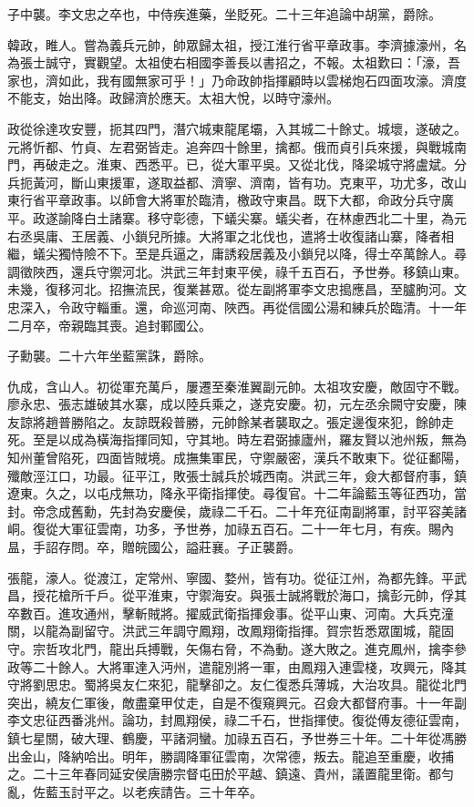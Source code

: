 \begin{pinyinscope}
子中襲。李文忠之卒也，中侍疾進藥，坐貶死。二十三年追論中胡黨，爵除。

韓政，睢人。嘗為義兵元帥，帥眾歸太祖，授江淮行省平章政事。李濟據濠州，名為張士誠守，實觀望。太祖使右相國李善長以書招之，不報。太祖歎曰：「濠，吾家也，濟如此，我有國無家可乎！」乃命政帥指揮顧時以雲梯炮石四面攻濠。濟度不能支，始出降。政歸濟於應天。太祖大悅，以時守濠州。

政從徐達攻安豐，扼其四門，潛穴城東龍尾壩，入其城二十餘丈。城壞，遂破之。元將忻都、竹貞、左君弼皆走。追奔四十餘里，擒都。俄而貞引兵來援，與戰城南門，再破走之。淮東、西悉平。已，從大軍平吳。又從北伐，降梁城守將盧斌。分兵扼黃河，斷山東援軍，遂取益都、濟寧、濟南，皆有功。克東平，功尤多，改山東行省平章政事。以師會大將軍於臨清，檄政守東昌。既下大都，命政分兵守廣平。政遂諭降白土諸寨。移守彰德，下蟻尖寨。蟻尖者，在林慮西北二十里，為元右丞吳庸、王居義、小鎖兒所據。大將軍之北伐也，遣將士收復諸山寨，降者相繼，蟻尖獨恃險不下。至是兵逼之，庸誘殺居義及小鎖兒以降，得士卒萬餘人。尋調徵陜西，還兵守禦河北。洪武三年封東平侯，祿千五百石，予世券。移鎮山東。未幾，復移河北。招撫流民，復業甚眾。從左副將軍李文忠搗應昌，至臚朐河。文忠深入，令政守輜重。還，命巡河南、陜西。再從信國公湯和練兵於臨清。十一年二月卒，帝親臨其喪。追封鄆國公。

子勳襲。二十六年坐藍黨誅，爵除。

仇成，含山人。初從軍充萬戶，屢遷至秦淮翼副元帥。太祖攻安慶，敵固守不戰。廖永忠、張志雄破其水寨，成以陸兵乘之，遂克安慶。初，元左丞余闕守安慶，陳友諒將趙普勝陷之。友諒既殺普勝，元帥餘某者襲取之。張定邊復來犯，餘帥走死。至是以成為橫海指揮同知，守其地。時左君弼據廬州，羅友賢以池州叛，無為知州董曾陷死，四面皆賊境。成撫集軍民，守禦嚴密，漢兵不敢東下。從征鄱陽，殲敵涇江口，功最。征平江，敗張士誠兵於城西南。洪武三年，僉大都督府事，鎮遼東。久之，以屯戍無功，降永平衛指揮使。尋復官。十二年論藍玉等征西功，當封。帝念成舊勳，先封為安慶侯，歲祿二千石。二十年充征南副將軍，討平容美諸峒。復從大軍征雲南，功多，予世券，加祿五百石。二十一年七月，有疾。賜內昷，手詔存問。卒，贈皖國公，謚莊襄。子正襲爵。

張龍，濠人。從渡江，定常州、寧國、婺州，皆有功。從征江州，為都先鋒。平武昌，授花槍所千戶。從平淮東，守禦海安。與張士誠將戰於海口，擒彭元帥，俘其卒數百。進攻通州，擊斬賊將。擢威武衛指揮僉事。從平山東、河南。大兵克潼關，以龍為副留守。洪武三年調守鳳翔，改鳳翔衛指揮。賀宗哲悉眾圍城，龍固守。宗哲攻北門，龍出兵搏戰，矢傷右脅，不為動。遂大敗之。進克鳳州，擒李參政等二十餘人。大將軍達入沔州，遣龍別將一軍，由鳳翔入連雲棧，攻興元，降其守將劉思忠。蜀將吳友仁來犯，龍擊卻之。友仁復悉兵薄城，大治攻具。龍從北門突出，繞友仁軍後，敵盡棄甲仗走，自是不復窺興元。召僉大都督府事。十一年副李文忠征西番洮州。論功，封鳳翔侯，祿二千石，世指揮使。復從傅友德征雲南，鎮七星關，破大理、鶴慶，平諸洞蠻。加祿五百石，予世券三十年。二十年從馮勝出金山，降納哈出。明年，勝調降軍征雲南，次常德，叛去。龍追至重慶，收捕之。二十三年春同延安侯唐勝宗督屯田於平越、鎮遠、貴州，議置龍里衛。都勻亂，佐藍玉討平之。以老疾請告。三十年卒。


\end{pinyinscope}
